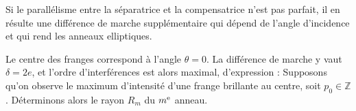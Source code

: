 \documentclass[12pt,fancy]{cours}
\begin{document}
\begin{remarque}
Si le parallélisme entre la séparatrice et la compensatrice n'est pas parfait, il en résulte une différence de marche supplémentaire qui dépend de l'angle d'incidence et qui rend les anneaux elliptiques.
\end{remarque}
%
%
%
%
%



Le centre des franges correspond à l’angle $\theta=0$. La différence de marche y vaut $\delta=2e$, et l'ordre d'interférences est alors maximal, d’expression
 : Supposons qu'on observe le maximum d'intensité d'une frange brillante au centre, soit $p_0 \in \mathbb{Z}$.
Déterminons alors le rayon $R_m$ du $m^{\rm e}$ anneau.
\end{document}
